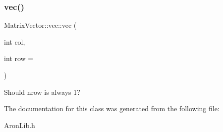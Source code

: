 \subsubsection{\texorpdfstring{vec()}{vec()}}
{\footnotesize\ttfamily Matrix\+Vector\+::vec\+::vec (\begin{DoxyParamCaption}\item[{int}]{col,  }\item[{int}]{row = {} }\end{DoxyParamCaption})}

Should nrow is always 1? 

The documentation for this class was generated from the following file\+:\begin{DoxyCompactItemize}
\item 
Aron\+Lib.\+h\end{DoxyCompactItemize}
